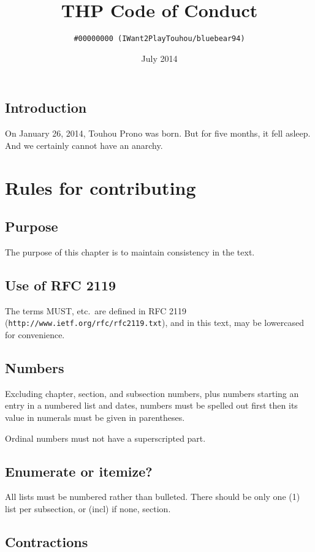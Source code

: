 \documentclass[10pt]{book}
\title{THP Code of Conduct}
\author{\texttt{\#00000000 (IWant2PlayTouhou/bluebear94)}}
\date{July 2014}
\begin{document}
\maketitle

\tableofcontents

\section{Introduction}

On January 26, 2014, Touhou Prono was born. But for five months, it fell asleep. And we certainly cannot have an anarchy.

\chapter{Rules for contributing}

\section{Purpose}

The purpose of this chapter is to maintain consistency in the text.

\section{Use of RFC 2119}

The terms MUST, etc.~are defined in RFC 2119 (\texttt{http://www.ietf.org/rfc/rfc2119.txt}), and in this text, may be lowercased for convenience.

\section{Numbers}

Excluding chapter, section, and subsection numbers, plus numbers starting an entry in a numbered list and dates, numbers must be spelled out first then its value in numerals must be given in parentheses.

Ordinal numbers must not have a superscripted part.

\section{Enumerate or itemize?}

All lists must be numbered rather than bulleted. There should be only one (1) list per subsection, or (incl) if none, section.

\section{Contractions}
\end{document}
